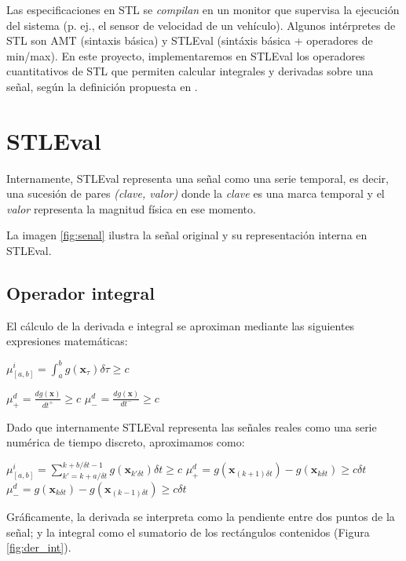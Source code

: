 Las especificaciones en STL se \textit{compilan} en un monitor que supervisa la ejecución del sistema (p. ej., el sensor de velocidad de un vehículo). Algunos intérpretes de STL son AMT \cite{AMT2} (sintaxis básica) y STLEval \cite{StlEval} (sintáxis básica + operadores de min/max). En este proyecto, implementaremos en STLEval los operadores cuantitativos de STL que permiten calcular integrales y derivadas sobre una señal, según la definición propuesta en \cite{Stl_Der_Int}.

\section{STLEval}

Internamente, STLEval representa una señal como una serie temporal, es decir, una sucesión de pares \textit{(clave, valor)} donde la \textit{clave} es una marca temporal y el \textit{valor} representa la magnitud física en ese momento.

La imagen \ref{fig:senal} ilustra la señal original y su representación interna en STLEval. 

\subsection{Operador integral}

El cálculo de la derivada e integral se aproximan mediante las siguientes expresiones matemáticas:

$\mu^i_{[a,b]} = \int^{b}_{a} g(\mathbf{x}_{\tau}) \delta \tau \geq c$

$\mu^d_{+} = \frac{dg(\mathbf{x})}{dt^+} \geq c $
$\mu^d_{-} = \frac{dg(\mathbf{x})}{dt^-} \geq c  $

Dado que internamente STLEval representa las señales reales como una serie numérica de tiempo discreto, aproximamos como:

$\mu^i_{[a,b]} = \sum^{k + b / \delta t - 1}_{k' = k + a / \delta t} g(\mathbf{x}_{k' \delta t}) \delta t \geq c$
$\mu^d_{+} = g(\mathbf{x}_{(k + 1) \delta t}) - g(\mathbf{x}_{k \delta t}) \geq c \delta t $
$\mu^d_{-} = g(\mathbf{x}_{k \delta t}) - g(\mathbf{x}_{(k - 1) \delta t}) \geq c \delta t $


Gráficamente, la derivada se interpreta como la pendiente entre dos puntos de la señal; y la integral como el sumatorio de los rectángulos contenidos (Figura \ref{fig:der_int}).

